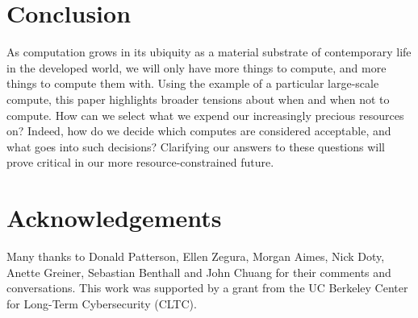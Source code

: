 \documentclass[sigconf]{acmart}
\begin{document}
\section{Conclusion}
\label{sec:org18d5841}

As computation grows in its ubiquity as a material substrate of contemporary life in the developed world,
we will only have more things to compute,
and more things to compute them with.
Using the example of a particular large-scale compute,
this paper highlights broader tensions about when and when not to compute.
How can we select what we expend our increasingly precious resources on?
Indeed, how do we decide which computes are considered acceptable, and what goes into such decisions?
Clarifying our answers to these questions will prove critical in our more resource-constrained future.

\section{Acknowledgements}
\label{sec:orgcb05820}
Many thanks to Donald Patterson, Ellen Zegura, Morgan Aimes, Nick Doty, Anette Greiner, Sebastian Benthall and John Chuang for their comments and conversations. 
This work was supported by a grant from the UC Berkeley Center for Long-Term Cybersecurity (CLTC).




\end{document}
